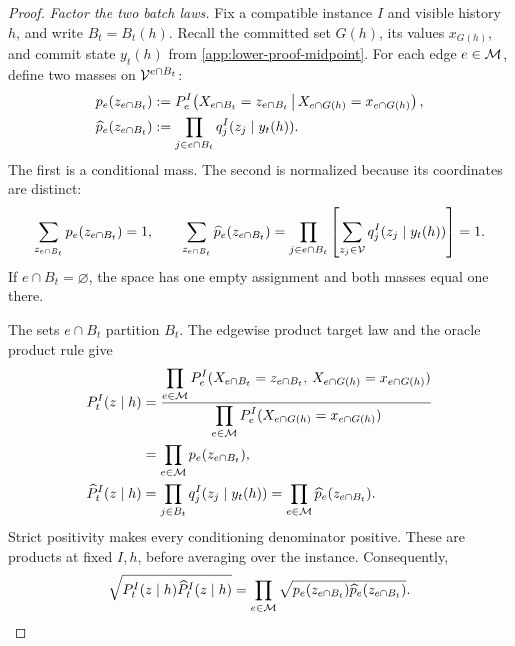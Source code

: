 \begin{proof}
\emph{Factor the two batch laws.}
Fix a compatible instance \(I\) and visible history \(h\), and write
\(B_t=B_t(h)\). Recall the committed set \(G(h)\), its values \(x_{G(h)}\),
and commit state \(y_t(h)\) from \cref{app:lower-proof-midpoint}.
For each edge \(e\in\HiddenMatching\), define two masses on
\(\Vocab^{e\cap B_t}\):
\begin{align*}
 p_e(z_{e\cap B_t})
 &:=\HardEdgeLaw{e}{I}\!\left(
   X_{e\cap B_t}=z_{e\cap B_t}
   \,\middle|\,
   X_{e\cap G(h)}=x_{e\cap G(h)}
 \right),\\
 \widehat p_e(z_{e\cap B_t})
 &:=\prod_{j\in e\cap B_t}
       \HardOracleRowMass{I}{y_t(h)}{j}{z_j}.
\end{align*}
The first is a conditional mass. The second is normalized because its
coordinates are distinct:
\[
 \sum_{z_{e\cap B_t}}p_e(z_{e\cap B_t})=1,
 \qquad
 \sum_{z_{e\cap B_t}}\widehat p_e(z_{e\cap B_t})
 =\prod_{j\in e\cap B_t}
   \left[\sum_{z_j\in\Vocab}
          \HardOracleRowMass{I}{y_t(h)}{j}{z_j}\right]=1.
\]
If \(e\cap B_t=\varnothing\), the space has one empty assignment and
both masses equal one there.

The sets \(e\cap B_t\) partition \(B_t\).
The edgewise product target law and the oracle product rule give
\begin{align*}
 \HardExactBatchLaw{t}{I}(z\mid h)
 &=\frac{\displaystyle\prod_{e\in\HiddenMatching}
      \HardEdgeLaw{e}{I}
       (X_{e\cap B_t}=z_{e\cap B_t},\,
        X_{e\cap G(h)}=x_{e\cap G(h)})}
     {\displaystyle\prod_{e\in\HiddenMatching}
      \HardEdgeLaw{e}{I}
       (X_{e\cap G(h)}=x_{e\cap G(h)})}\\
 &=\prod_{e\in\HiddenMatching}p_e(z_{e\cap B_t}),\\
 \HardProductBatchLaw{t}{I}(z\mid h)
 &=\prod_{j\in B_t}\HardOracleRowMass{I}{y_t(h)}{j}{z_j}
 =\prod_{e\in\HiddenMatching}\widehat p_e(z_{e\cap B_t}).
\end{align*}
Strict positivity makes every conditioning denominator positive.
These are products at fixed \(I,h\), before averaging over the instance.
Consequently,
\begin{equation}
 \sqrt{\HardExactBatchLaw{t}{I}(z\mid h)
       \HardProductBatchLaw{t}{I}(z\mid h)}
 =\prod_{e\in\HiddenMatching}
       \sqrt{p_e(z_{e\cap B_t})\widehat p_e(z_{e\cap B_t})}.
 \label{app:eq:commit-midpoint-numerator-factorization}
\end{equation}


\end{proof}
